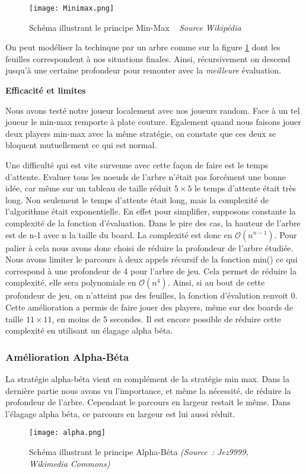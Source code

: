 \documentclass[12pt]{article}
\begin{document}
\begin{figure}[ht!]
\centering
    \texttt{[image: Minimax.png]}
    \caption{Schéma illustrant le principe Min-Max \newline ~ \textit{Source Wikipédia}}
    \label{fig:min_max}
\end{figure}

On peut modéliser la techinque par un arbre comme sur la figure \ref{fig:min_max} dont les feuilles correspondent à nos situations finales. Ainsi, récursivement on descend jusqu'à une certaine profondeur pour remonter avec la \textit{meilleure} évaluation.
\newline


\textbf{Efficacité et limites}\newline

Nous avons testé notre joueur localement avec nos joueurs random. Face à un tel joueur le min-max remporte à plate couture. Egalement quand nous faisons jouer deux players min-max avec la même stratégie, on constate que ces deux se bloquent mutuellement ce qui est normal.

Une difficulté qui est vite survenue avec cette façon de faire est le temps d'attente. Evaluer tous les noeuds de l'arbre n'était pas forcément une bonne idée, car même sur un tableau de taille réduit $5\times5$ le temps d'attente était très long. Non seulement le temps d'attente était long, mais la complexité de l'algorithme était exponentielle. En effet pour simplifier, supposons constante la complexité de la fonction d'évaluation. Dans le pire des cas, la hauteur de l'arbre est de n-1 avec n la taille du board. La complexité est donc en $\mathcal{O}({n^{n-1}})$. Pour palier à cela nous avons donc choisi de réduire la profondeur de l'arbre étudiée. Nous avons limiter le parcours à deux appels récursif de la fonction min() ce qui correspond à une profondeur de 4 pour l'arbre de jeu. Cela permet de réduire la complexité, elle sera polynomiale en $\mathcal{O}({n^4})$. Ainsi, si au bout de cette profondeur de jeu, on n'atteint pas des feuilles, la fonction d'évalution renvoit 0. Cette amélioration a permis de faire jouer des players, même sur des boards de taille $11\times11$, en moins de 5 secondes.\newline
Il est encore possible de réduire cette complexité en utilisant un élagage alpha béta.


\subsubsection{Amélioration Alpha-Béta}
La stratégie alpha-béta vient en complément de la stratégie min max. Dans la dernière partie nous avons vu l'importance, et même la nécessité, de réduire la profondeur de l'arbre. Cependant le parcours en largeur restait le même. Dans l'élagage alpha béta, ce parcours en largeur est lui aussi réduit.
\begin{figure}[ht!]
\centering
    \texttt{[image: alpha.png]}
    \caption{Schéma illustrant le principe Alpha-Béta \emph{(Source~: Jez9999, Wikimedia Commons)}}
    \label{fig:fig1}
\end{figure}
\end{document}
